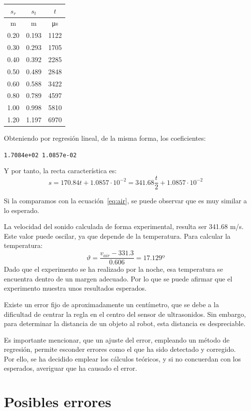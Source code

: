 \documentclass[10pt,a4paper,hidelinks]{article}
\begin{document}
\begin{multicols}{2}
\begin{center}
\begin{tabular}{ | c | c | c | }
\hline
$s_{r}$ & $s_{t}$ & $t$\\ \hline
m & m & \si{\micro\second} \\ \hline \hline
0.20 & 0.193 & 1122 \\ \hline
0.30 & 0.293 & 1705 \\ \hline
0.40 & 0.392 & 2285 \\ \hline
0.50 & 0.489 & 2848 \\ \hline
0.60 & 0.588 & 3422 \\ \hline
0.80 & 0.789 & 4597 \\ \hline
1.00 & 0.998 & 5810 \\ \hline
1.20 & 1.197 & 6970 \\ \hline
\end{tabular}
\end{center}

Obteniendo por regresión lineal, de la misma forma, los coeficientes:
\begin{center}
\texttt{1.7084e+02   1.0857e-02}
\end{center}
Y por tanto, la recta característica es:
$$ s = 170.84 t + 1.0857\cdot 10^{-2} = 341.68\frac{t}{2} + 1.0857\cdot 10^{-2}
$$

Si la comparamos con la ecuación~\ref{eq:air}, se puede observar que es muy 
similar a lo esperado.

La velocidad del sonido calculada de forma experimental, resulta ser 341.68 m/s.  
Este valor puede oscilar, ya que depende de la temperatura. Para calcular la 
temperatura:
$$ \vartheta = \frac{v_{air}-331.3}{0.606} = 17.129 º $$
Dado que el experimento se ha realizado por la noche, esa temperatura se 
encuentra dentro de un margen adecuado. Por lo que se puede afirmar que el 
experimento muestra unos resultados esperados.

Existe un error fijo de aproximadamente un centímetro, que se debe a la 
dificultad de centrar la regla en el centro del sensor de ultrasonidos. Sin 
embargo, para determinar la distancia de un objeto al robot, esta distancia es 
despreciable.

Es importante mencionar, que un ajuste del error, empleando un método de 
regresión, permite esconder errores como el que ha sido detectado y corregido.  
Por ello, se ha decidido emplear los cálculos teóricos, y si no concuerdan con 
los esperados, averiguar que ha causado el error.

\section{Posibles errores}


\end{multicols}
\end{document}
